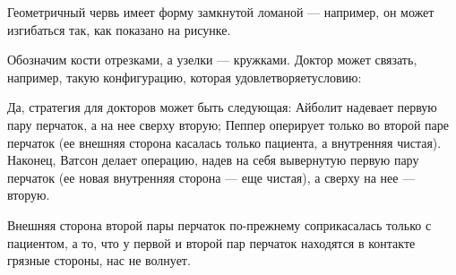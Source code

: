﻿
\begin{itemize}

\itA Геометричный червь имеет форму замкнутой ломаной — например, он может изгибаться так, как показано на рисунке.

\begin{center}  \end{center}

\itB Обозначим кости отрезками, а узелки — кружками. Доктор может связать, например, такую конфигурацию, которая удовлетворяет\linebreak условию:

\begin{center}  \end{center}

\itC Да, стратегия для докторов может быть следующая: Айболит надевает первую пару перчаток, а на нее сверху вторую; Пеппер оперирует только во второй паре перчаток (ее внешняя сторона касалась только пациента, а внутренняя чистая). Наконец, Ватсон делает операцию, надев на себя вывернутую первую пару перчаток (ее новая внутренняя сторона — еще чистая), а сверху на нее — вторую.

Внешняя сторона второй пары перчаток по-прежнему соприкасалась только с пациентом, а то, что у первой и второй пар перчаток находятся в контакте грязные стороны, нас не волнует.
\end{itemize}